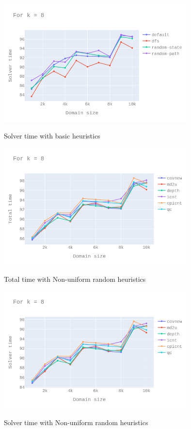 \documentclass[11pt,a4paper,notitlepage]{article}
\begin{document}
\begin{figure}[h]
\centering
\includegraphics[width=10cm]{k_8_st_basic_heur.png}
\label{fig:basic_heur_st}
\caption{Solver time with basic heuristics}
\centering
\end{figure}

\begin{figure}[h]
\centering
\includegraphics[width=10cm]{k_8_tt_nonuni_heur.png}
\label{fig:nonuni_heur_tt}
\caption{Total time with Non-uniform random heuristics}
\centering
\end{figure}

\begin{figure}[h]
\centering
\includegraphics[width=10cm]{k_8_st_nonuni_heur.png}
\label{fig:nonuni_heur_st}
\caption{Solver time with Non-uniform random heuristics}
\centering
\end{figure}
\end{document}
